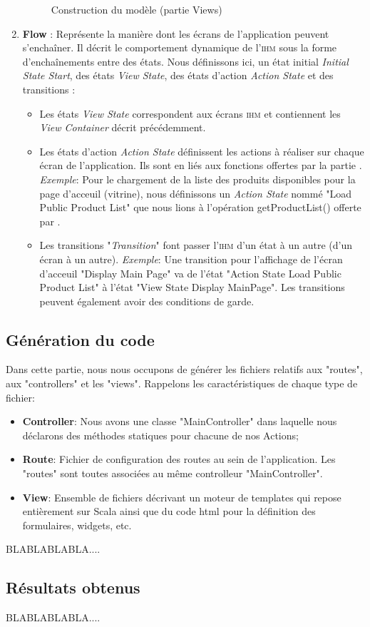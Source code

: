 \begin{enumerate}
\begin{figure}[H]
  \caption{Construction du modèle (partie Views)}
  \label{fig:Construction du modèle (partie Views)}
\end{figure}
\item \textbf{Flow} : Représente la manière dont les écrans de l'application peuvent s'enchaîner. Il décrit le comportement dynamique de l'\textsc{ihm} sous la forme d'enchaînements entre des états. Nous définissons ici, un état initial \textit{Initial State Start}, des états \textit{View State}, des états d'action \textit{Action State} et des transitions :
\begin{itemize}
\item Les états \textit{View State} correspondent aux écrans \textsc{ihm} et contiennent les \textit{View Container} décrit précédemment.
\item Les états d'action \textit{Action State} définissent les actions à réaliser sur chaque écran de l'application. Ils sont en liés aux fonctions offertes par la partie \kwsoa{}. 
\newline
\textit{Exemple}: Pour le chargement de la liste des produits disponibles pour la page d'acceuil (vitrine), nous définissons un \textit{Action State} nommé "Load Public Product List" que nous lions à l'opération getProductList() offerte par \kwsoa{}.  
\item Les transitions "\textit{Transition}" font passer l'\textsc{ihm} d'un état à un autre (d'un écran à un autre). 
\newline
\textit{Exemple}: Une transition pour l'affichage de l'écran d'acceuil "Display Main Page" va de l'état "Action State Load Public Product List" à l'état "View State Display MainPage".
\newline
Les transitions peuvent également avoir des conditions de garde.
\end{itemize}
\end{enumerate}				
\subsection{Génération du code}
Dans cette partie, nous nous occupons de générer les fichiers relatifs aux "routes", aux "controllers" et les "views". Rappelons les caractéristiques de chaque type de fichier:
\begin{itemize}
\item \textbf{Controller}: Nous avons une classe "MainController" dans laquelle nous déclarons des méthodes statiques pour chacune de nos Actions;
\item \textbf{Route}: Fichier de configuration des routes au sein de l'application. Les "routes" sont toutes associées au même controlleur "MainController".
\item \textbf{View}: Ensemble de fichiers décrivant un moteur de templates qui repose entièrement sur Scala ainsi que du code html pour la définition des formulaires, widgets, etc. 
\end{itemize}
BLABLABLABLA....
\subsection{Résultats obtenus}
BLABLABLABLA....
